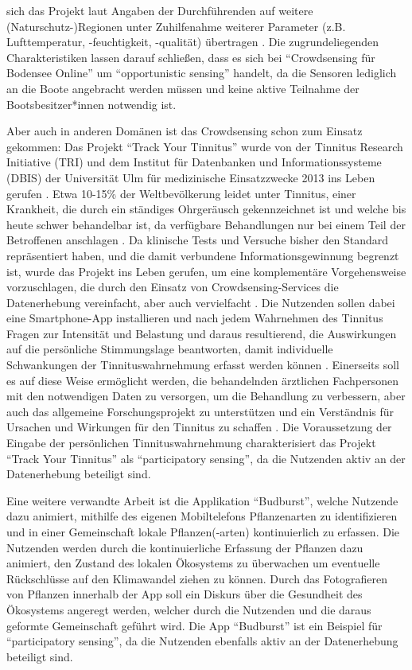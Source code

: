 sich das Projekt laut Angaben der Durchführenden auf weitere (Naturschutz-)Regionen unter Zuhilfenahme weiterer Parameter (z.B. Lufttemperatur, -feuchtigkeit, -qualität) übertragen \cite{Bodensee2021}. Die zugrundeliegenden Charakteristiken lassen darauf schließen, dass es sich bei \enquote{Crowdsensing für Bodensee Online} um \enquote{opportunistic sensing} handelt, da die Sensoren lediglich an die Boote angebracht werden müssen und keine aktive Teilnahme der Bootsbesitzer*innen notwendig ist. 

Aber auch in anderen Domänen ist das Crowdsensing schon zum Einsatz gekommen: Das Projekt \enquote{Track Your Tinnitus} wurde von der Tinnitus Research Initiative (TRI) und dem Institut für Datenbanken und Informationssysteme (DBIS) der Universität Ulm für medizinische Einsatzzwecke 2013 ins Leben gerufen \cite{Pryss2017}. Etwa 10-15\% der Weltbevölkerung leidet unter Tinnitus, einer Krankheit, die durch ein ständiges Ohrgeräusch gekennzeichnet ist und welche bis heute schwer behandelbar ist, da verfügbare Behandlungen nur bei einem Teil der Betroffenen anschlagen \cite{langguth2011review}. Da klinische Tests und Versuche bisher den Standard repräsentiert haben, und die damit verbundene Informationsgewinnung begrenzt ist, wurde das Projekt ins Leben gerufen, um eine komplementäre Vorgehensweise vorzuschlagen, die durch den Einsatz von Crowdsensing-Services die Datenerhebung vereinfacht, aber auch vervielfacht \cite{pryss2015mobile}. Die Nutzenden sollen dabei eine Smartphone-App installieren und nach jedem Wahrnehmen des Tinnitus Fragen zur Intensität und Belastung und daraus resultierend, die Auswirkungen auf die persönliche Stimmungslage beantworten, damit individuelle Schwankungen der Tinnituswahrnehmung erfasst werden können \cite{pryss2015mobile}. Einerseits soll es auf diese Weise ermöglicht werden, die behandelnden ärztlichen Fachpersonen mit den notwendigen Daten zu versorgen, um die Behandlung zu verbessern, aber auch das allgemeine Forschungsprojekt zu unterstützen und ein Verständnis für Ursachen und Wirkungen für den Tinnitus zu schaffen \cite{pryss2015mobile}. Die Voraussetzung der Eingabe der persönlichen Tinnituswahrnehmung charakterisiert das Projekt \enquote{Track Your Tinnitus} als \enquote{participatory sensing}, da die Nutzenden aktiv an der Datenerhebung beteiligt sind.

Eine weitere verwandte Arbeit ist die Applikation \enquote{Budburst}, welche Nutzende dazu animiert, mithilfe des eigenen Mobiltelefons Pflanzenarten zu identifizieren und in einer Gemeinschaft lokale Pflanzen(-arten) kontinuierlich zu erfassen. Die Nutzenden werden durch die kontinuierliche Erfassung der Pflanzen dazu animiert, den Zustand des lokalen Ökosystems zu überwachen um eventuelle Rückschlüsse auf den Klimawandel ziehen zu können. Durch das Fotografieren von Pflanzen innerhalb der App soll ein Diskurs über die Gesundheit des Ökosystems angeregt werden, welcher durch die Nutzenden und die daraus geformte Gemeinschaft geführt wird. Die App \enquote{Budburst} ist ein Beispiel für \enquote{participatory sensing}, da die Nutzenden ebenfalls aktiv an der Datenerhebung beteiligt sind.

